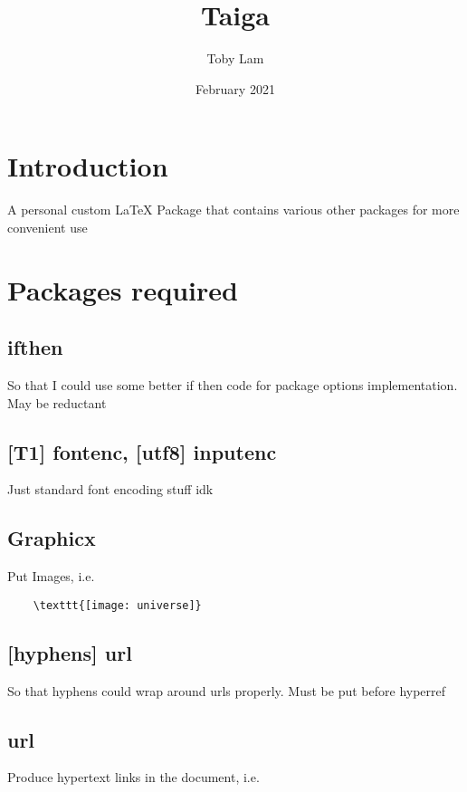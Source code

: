 \documentclass{article}
\title{Taiga}
\author{Toby Lam}
\date{February 2021}
\begin{document}
\maketitle

\section{Introduction}

A personal custom LaTeX Package that contains various other packages for more convenient use

\section{Packages required}

\subsection{ifthen}

So that I could use some better if then code for package options implementation. May be reductant

\subsection{[T1] fontenc, [utf8] inputenc}

Just standard font encoding stuff idk

\subsection{Graphicx}

Put Images, i.e.

\begin{verbatim}
	\texttt{[image: universe]}
\end{verbatim} 

\subsection{[hyphens] url}

So that hyphens could wrap around urls properly. Must be put before hyperref

\subsection{url}

Produce hypertext links in the document, i.e.
\end{document}
